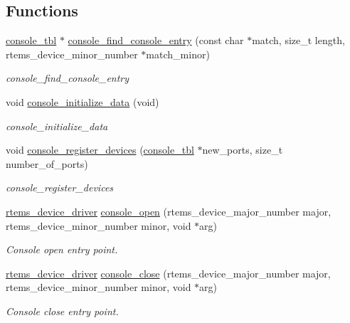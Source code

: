\subsection*{Functions}
\begin{DoxyCompactItemize}
\item 
\mbox{\hyperlink{struct__console__tbl}{console\+\_\+tbl}} $\ast$ \mbox{\hyperlink{legacy-console_8c_a504c826507edc4631251f6e2ccbeac8b}{console\+\_\+find\+\_\+console\+\_\+entry}} (const char $\ast$match, size\+\_\+t length, rtems\+\_\+device\+\_\+minor\+\_\+number $\ast$match\+\_\+minor)
\begin{DoxyCompactList}\small\item\em console\+\_\+find\+\_\+console\+\_\+entry \end{DoxyCompactList}\item 
void \mbox{\hyperlink{legacy-console_8c_a876e108a27082ad7b2a68f26dd37b673}{console\+\_\+initialize\+\_\+data}} (void)
\begin{DoxyCompactList}\small\item\em console\+\_\+initialize\+\_\+data \end{DoxyCompactList}\item 
void \mbox{\hyperlink{legacy-console_8c_ab7b7632a5db0bff08d69845c22ec1d56}{console\+\_\+register\+\_\+devices}} (\mbox{\hyperlink{struct__console__tbl}{console\+\_\+tbl}} $\ast$new\+\_\+ports, size\+\_\+t number\+\_\+of\+\_\+ports)
\begin{DoxyCompactList}\small\item\em console\+\_\+register\+\_\+devices \end{DoxyCompactList}\item 
\mbox{\hyperlink{group__ClassicStatus_ga545d41846817eaba6143d52ee4d9e9fe}{rtems\+\_\+device\+\_\+driver}} \mbox{\hyperlink{legacy-console_8c_a3f4320ff384009c3bdfa6ec4f1b79501}{console\+\_\+open}} (rtems\+\_\+device\+\_\+major\+\_\+number major, rtems\+\_\+device\+\_\+minor\+\_\+number minor, void $\ast$arg)
\begin{DoxyCompactList}\small\item\em Console open entry point. \end{DoxyCompactList}\item 
\mbox{\hyperlink{group__ClassicStatus_ga545d41846817eaba6143d52ee4d9e9fe}{rtems\+\_\+device\+\_\+driver}} \mbox{\hyperlink{legacy-console_8c_a4efabb094608f8155b1a679e03f2eafc}{console\+\_\+close}} (rtems\+\_\+device\+\_\+major\+\_\+number major, rtems\+\_\+device\+\_\+minor\+\_\+number minor, void $\ast$arg)
\begin{DoxyCompactList}\small\item\em Console close entry point. \end{DoxyCompactList}\item 

\end{DoxyCompactItemize}
